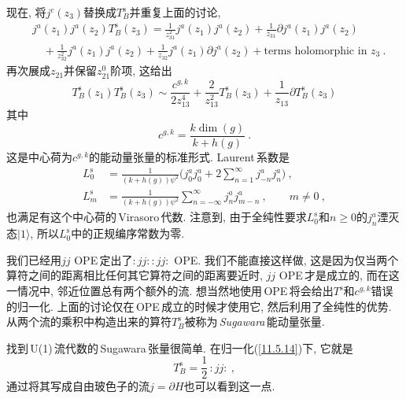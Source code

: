 现在, 将$ j^{c}(z_{3}) $替换成$ T_{B}^{\mathrm{s}} $并重复上面的讨论,
\begin{align}
    &j^{a}(z_{1})j^{a}(z_{2})T_{B}^{\mathrm{s}}(z_{3})=\frac{1}{z_{31}^{2}}j^{a}(z_{1})j^{a}(z_{2})
    +\frac{1}{z_{31}}\partial j^{a}(z_{1}) j^{a}(z_{2}) \nonumber \\
    &\quad +\frac{1}{z_{32}^{2}} j^{a}(z_{1})j^{a}(z_{2})+\frac{1}{z_{32}}j^{a}(z_{1})\partial j^{a}(z_{2})
    +\text{terms holomorphic in } z_{3} \:. \label{11.5.23}
\end{align}
再次展成$ z_{21} $并保留$ z_{21}^{0} $阶项, 这给出
\begin{equation}
    T_{B}^{\mathrm{s}}(z_{1})T_{B}^{\mathrm{s}}(z_{3}) \sim \frac{c^{g,k}}{2z_{13}^{4}}+\frac{2}{z_{13}^{2}}T_{B}^{\mathrm{s}}(z_{3})+\frac{1}{z_{13}}\partial T_{B}^{\mathrm{s}}(z_{3}) \label{11.5.24}
\end{equation}
其中
\begin{equation}
    c^{g,k}=\frac{k\operatorname{dim}(g)}{k+h(g)} \:. \label{11.5.25}
\end{equation}
这是中心荷为$ c^{g,k} $的能动量张量的标准形式. Laurent\,系数是
\begin{subequations}
\begin{align}
    L_{0}^{\mathrm{s}} &= \frac{1}{(k+h(g))\psi^{2}}\biggl(j_{0}^{a}j_{0}^{a}
    +2\sum_{n=1}^{\infty}j_{-n}^{a}j_{n}^{a}\biggr) \:, \label{11.5.26a} \\
    L_{m}^{\mathrm{s}} &= \frac{1}{(k+h(g))\psi^{2}}\sum_{n=-\infty}^{\infty}j_{n}^{a}j_{m-n}^{a}\:,\qquad m\neq0\:,
    \label{11.5.26b}
\end{align} \label{11.5.26}
\end{subequations}
也满足有这个中心荷的\,Virasoro\,代数. 注意到, 由于全纯性要求$ L_{0}^{\mathrm{s}} $和$ n\geq0 $的$ j_{n}^{a} $湮灭态$ \lvert 1\rangle$, 所以$ L_{0}^{\mathrm{s}} $中的正规编序常数为零.

我们已经用$ jj $ OPE\,定出了$ :jj::jj:$ OPE. 我们不能直接这样做, 这是因为仅当两个算符之间的距离相比任何其它算符之间的距离要近时, $jj$ OPE\,才是成立的, 而在这一情况中, 邻近位置总有两个额外的流. 想当然地使用\,OPE\,将会给出$ T^{\mathrm{s}} $和$ c^{g,k} $错误的归一化. 上面的讨论仅在\,OPE\,成立的时候才使用它, 然后利用了全纯性的优势. 从两个流的乘积中构造出来的算符$ T_{B}^{\mathrm{s}} $被称为\,\textit{Sugawara}\,能动量张量.

找到\,U(1)\,流代数的\,Sugawara\,张量很简单. 在归一化(\ref{11.5.14})下, 它就是
\begin{equation}
    T_{B}^{\mathrm{s}} =\frac{1}{2}\,:jj: \:, \label{11.5.27}
\end{equation}
通过将其写成自由玻色子的流$ j=\partial H $也可以看到这一点. 

